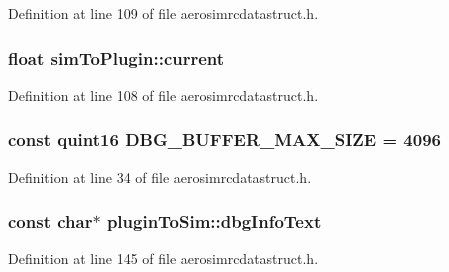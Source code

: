\-Definition at line 109 of file aerosimrcdatastruct.\-h.

\hypertarget{group___aero_sim_r_c_ga67b8bd84d98afe25c5300ecaa1e3b1ac}{
\subsubsection[{current}]{\setlength{\rightskip}{0pt plus 5cm}float {\bf sim\-To\-Plugin\-::current}}}\label{group___aero_sim_r_c_ga67b8bd84d98afe25c5300ecaa1e3b1ac}


\-Definition at line 108 of file aerosimrcdatastruct.\-h.

\hypertarget{group___aero_sim_r_c_ga4ac56108ad3d382deff679f792d02874}{
\subsubsection[{\-D\-B\-G\-\_\-\-B\-U\-F\-F\-E\-R\-\_\-\-M\-A\-X\-\_\-\-S\-I\-Z\-E}]{\setlength{\rightskip}{0pt plus 5cm}const quint16 {\bf \-D\-B\-G\-\_\-\-B\-U\-F\-F\-E\-R\-\_\-\-M\-A\-X\-\_\-\-S\-I\-Z\-E} = 4096}}\label{group___aero_sim_r_c_ga4ac56108ad3d382deff679f792d02874}


\-Definition at line 34 of file aerosimrcdatastruct.\-h.

\hypertarget{group___aero_sim_r_c_ga8d1dec1f6592d85b15941b3ce658f44a}{
\subsubsection[{dbg\-Info\-Text}]{\setlength{\rightskip}{0pt plus 5cm}const char$\ast$ {\bf plugin\-To\-Sim\-::dbg\-Info\-Text}}}\label{group___aero_sim_r_c_ga8d1dec1f6592d85b15941b3ce658f44a}


\-Definition at line 145 of file aerosimrcdatastruct.\-h.

